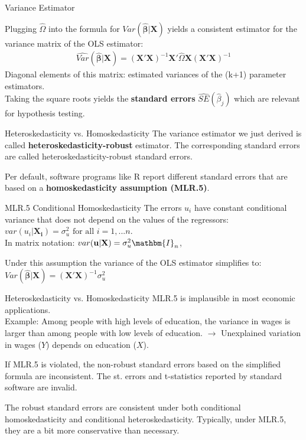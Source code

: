 \documentclass[11pt, aspectratio = 169]{beamer}
\begin{document}
\begin{frame}{Variance Estimator}

Plugging $\widehat{\Omega}$ into the formula for $Var(\hat{\boldsymbol{\beta}}|\mathbf{X})$ yields a consistent estimator for the variance matrix of the OLS estimator:
\begin{align*}
   \widehat{Var}(\hat{\boldsymbol{\beta}}|\mathbf{X}) = (\mathbf{X}'\mathbf{X})^{-1}\mathbf{X}'\hat{\Omega}\mathbf{X}(\mathbf{X}'\mathbf{X})^{-1}
\end{align*}
Diagonal elements of this matrix: estimated variances of the (k+1) parameter estimators. \\
Taking the square roots yields the \color{teal}\textbf{standard errors} $\widehat{SE}(\hat{\beta}_j)$ \color{black} which are relevant for hypothesis testing.

\end{frame}


\begin{frame}{Heteroskedasticity vs. Homoskedasticity}
The variance estimator we just derived is called \color{teal}\textbf{heteroskedasticity-robust}  \color{black}estimator. The corresponding standard errors are called heteroskedasticity-robust standard errors.

Per default, software programs like R report different standard errors that are based on a \textbf{homoskedasticity assumption (MLR.5)}.
\vspace{+.12cm}

\begin{alertblock}{MLR.5 Conditional Homoskedasticity}
\vspace{+.12cm}
The errors $u_i$ have constant conditional variance that does not depend on the values of the regressors:
$var(u_i|\mathbf{X_i}) = \sigma_u^2 \text{ for all } i = 1,...n.$ \\
In matrix notation: $var(\mathbf{u}|\mathbf{X}) = \sigma_u^2\mathbm{I}_n$,
\end{alertblock}

Under this assumption the variance of the OLS estimator simplifies to:
$ Var(\hat{\boldsymbol{\beta}}|\mathbf{X}) = (\mathbf{X}'\mathbf{X})^{-1}\sigma_u^2$
\end{frame}

\begin{frame}{Heteroskedasticity vs. Homoskedasticity}
\alert{MLR.5 is implausible in most economic applications.} \\
Example: Among people with high levels of education, the variance in wages is larger than among people with low levels of education. $\rightarrow$ Unexplained variation in wages ($Y$) depends on education ($X$).  

If MLR.5 is violated, the non-robust standard errors based on the simplified formula are inconsistent. The st. errors and t-statistics reported by standard software are invalid.

The robust standard errors are consistent under both conditional homoskedasticity  and conditional heteroskedasticity. Typically, under MLR.5, they are a bit more conservative than necessary.
\end{frame}
\end{document}

